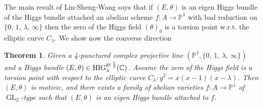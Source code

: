 \documentclass[12pt,twoside]{book}
\theoremstyle{plain}
\newtheorem{theorem}{Theorem}[section]
\theoremstyle{definition}
\theoremstyle{remark}
\newcommand{\bC}{{\mathbb C}}
\DeclareMathOperator\GL{GL}
\numberwithin{equation}{section}
\def\High{{\mathrm{HIG}^{{\rm gr}\,{1\over 2}}_{\lambda}}}
\begin{document}
The main result of Lin-Sheng-Wang says that if $(E,\theta)$ is an eigen Higgs bundle of the Higgs bundle attached an abelian scheme $f: A\to \mathbb P^1$ with bad reduction on $\{0,\,1,\,\lambda,\,\infty\}$ then the zero of the Higgs field $(\theta)_0$ is a torsion point w.r.t. the elliptic curve $C_\lambda$. We show now the converse direction
\begin{theorem} \label{thm_main_motivic_torsion_description}
Given a 4-punctured complex projective line $(\mathbb P^1,\{0,\,1,\,\lambda,\,\infty\})$ and a Higgs bundle
$(E,\theta)\in \High(\bC)$. Assume the zero of the Higgs field is a torsion point with respect to the elliptic curve $C_\lambda\colon y^2=x(x-1)(x-\lambda)$. Then $(E,\theta)$ is motivic, and there exists a family of abelian varieties $f: A\to \mathbb P^1$ of $\GL_2$-type such that $(E,\theta)$ is an eigen Higgs bundle attached to $f$.
\end{theorem}
\end{document}
